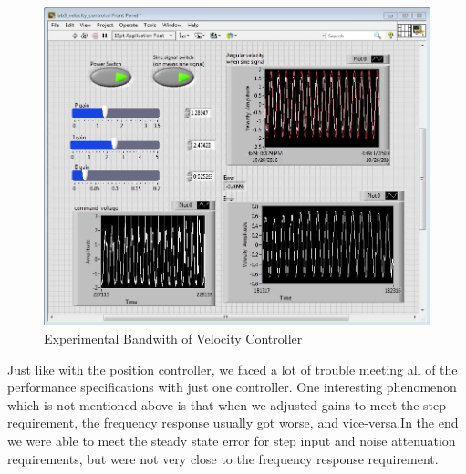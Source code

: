\documentclass[letterpaper]{article}
\begin{document}
\begin{figure}[H]
\begin{center}
\includegraphics[width = 15cm]{velocity_control_sine_15hz.JPG}
\caption{Experimental Bandwith of Velocity Controller}
\label{real_Bandwidth}
\end{center}
\end{figure}

Just like with the position controller, we faced a lot of trouble meeting all of the performance specifications with just one controller. One interesting phenomenon which is not mentioned above is that when we adjusted gains to meet the step requirement, the frequency response usually got worse, and vice-versa.In the end we were able to meet the steady state error for step input and noise attenuation requirements, but were not very close to the frequency response requirement.\\

\clearpage
\end{document}
